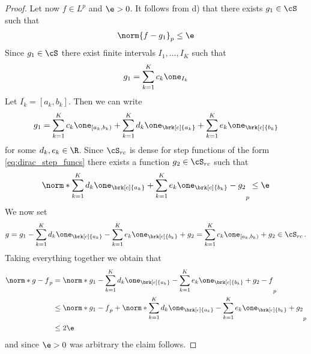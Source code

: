\begin{proof}
Let now $f\in L^p$ and $\e>0$. It follows from d) that there exists $g_1\in \cS$ such that
\begin{align*}
	\norm{f-g_1}_{p}\leq \e
\end{align*}
Since $g_1\in \cS$ there exist finite intervals $I_1,\dots,I_K$ such that
\begin{align*}
	g_1=\sum_{k=1}^Kc_k\one_{I_k}
\end{align*}
Let $\overline{I_k}=[a_k,b_k]$. Then we can write 
\begin{align*}
	g_1=\sum_{k=1}^Kc_k\one_{[a_k,b_k)}+\sum_{k=1}^Kd_k\one_{\brk[c]{a_k}}+\sum_{k=1}^Ke_k\one_{\brk[c]{b_k}}
\end{align*}
for some $d_k,e_k\in\R$. Since $\cS_{rc}$ is dense for step functions of the form \eqref{eq:dirac_step_funcs} there exists a function $g_2\in\cS_{rc}$ such that
\begin{align*}
	\norm*{\sum_{k=1}^Kd_k\one_{\brk[c]{a_k}}+\sum_{k=1}^Ke_k\one_{\brk[c]{b_k}}-g_2}_p\leq \e
\end{align*}
We now set
\begin{align*}
	g= g_1 -\sum_{k=1}^Kd_k\one_{\brk[c]{a_k}}-\sum_{k=1}^Ke_k\one_{\brk[c]{b_k}}+g_2= \sum_{k=1}^Kc_k\one_{[a_k,b_k)}+g_2\in\cS_{rc}\,.
\end{align*}
Taking everything together we obtain that
\begin{align*}
	\norm*{g-f}_p
	&=\norm*{g_1 -\sum_{k=1}^Kd_k\one_{\brk[c]{a_k}}-\sum_{k=1}^Ke_k\one_{\brk[c]{b_k}}+g_2-f}_p \\
	&\leq \norm*{g_1-f}_p+\norm*{\sum_{k=1}^Kd_k\one_{\brk[c]{a_k}}-\sum_{k=1}^Ke_k\one_{\brk[c]{b_k}}+g_2}_p \\
	&\leq 2\e
\end{align*}
and since $\e>0$ was arbitrary the claim follows.
\end{proof}

